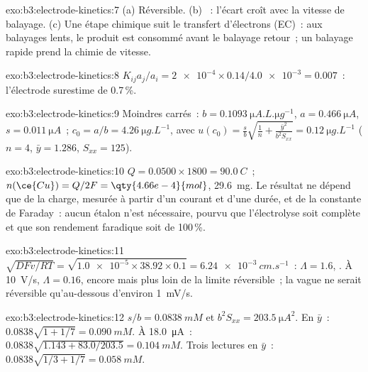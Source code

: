 \begin{solution}{exo:b3:electrode-kinetics:7}
(a) Réversible. (b) ~: l'écart croît avec la vitesse de
balayage.
(c) Une étape chimique suit le transfert d'électrons (EC)~: aux
balayages lents, le produit est consommé avant le balayage retour~; un
balayage rapide prend la chimie de vitesse.
\end{solution}

\begin{solution}{exo:b3:electrode-kinetics:8}
$K_{ij}a_j/a_i = \num{2e-4} \times 0.14/\num{4.0e-3} = 0.007$~: l'électrode surestime de 0.7\,\%.
\end{solution}

\begin{solution}{exo:b3:electrode-kinetics:9}
Moindres carrés~: $b = \qty{0.1093}{\micro A.L.\micro g^{-1}}$, $a = \qty{0.466}{\micro A}$, $s = \qty{0.011}{\micro A}$~; $c_0 = a/b =
\qty{4.26}{\micro g.L^{-1}}$, avec $u(c_0) = \frac sb\sqrt{\frac1n + \frac{\bar y^2}{b^2S_{xx}}} = \qty{0.12}{\micro g.L^{-1}}$
($n = 4$, $\bar y = 1.286$, $S_{xx} = 125$).
\end{solution}

\begin{solution}{exo:b3:electrode-kinetics:10}
$Q = 0.0500 \times 1800 = \qty{90.0}{C}$~; $n(\ce{Cu}) = Q/2F = \qty{4.66e-4}{mol}$,
\qty{29.6}{mg}. Le
résultat ne dépend que de la charge, mesurée à partir d'un courant et
d'une durée, et de la constante de Faraday~: aucun étalon n'est
nécessaire, pourvu que l'électrolyse soit complète et que son rendement
faradique soit de 100\,\%.
\end{solution}

\begin{solution}{exo:b3:electrode-kinetics:11}
$\sqrt{DFv/RT} = \sqrt{\num{1.0e-5} \times 38.92 \times 0.1} = \qty{6.24e-3}{cm.s^{-1}}$~: $\Lambda = 1.6$, .
À \qty{10}{V/s}, $\Lambda = 0.16$, encore  mais plus loin
de la limite réversible~; la vague ne serait réversible qu'au-dessous
d'environ \qty{1}{mV/s}.
\end{solution}

\begin{solution}{exo:b3:electrode-kinetics:12}
$s/b = \qty{0.0838}{mM}$ et $b^2S_{xx} = \qty{203.5}{\micro A^2}$. En $\bar y$~: $0.0838\sqrt{1 + 1/7} = \qty{0.090}{mM}$.
À \qty{18.0}{\micro A}~: $0.0838\sqrt{1.143 + 83.0/203.5} = \qty{0.104}{mM}$.
Trois lectures en $\bar y$~:
$0.0838\sqrt{1/3 + 1/7} = \qty{0.058}{mM}$.
\end{solution}

